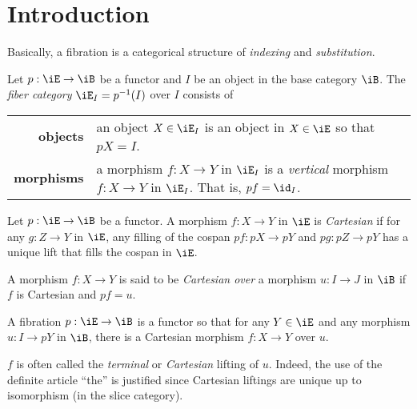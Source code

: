 \documentclass{amsart}
\title{}
\author{Frank Tsai}
\date{\today}
\begin{document}
\maketitle
\tableofcontents

\section{Introduction}
\label{sec:introduction}
Basically, a fibration is a categorical structure of \emph{indexing} and \emph{substitution}.

\begin{defn}
  Let $p : \iE \to \iB$ be a functor and $I$ be an object in the base category $\iB$.
  The \emph{fiber category} $\iE_{I} = p\inv(I)$ over $I$ consists of
  \begin{center}
    \begin{tabularx}{\linewidth}{rX}
      \textbf{objects} & an object $X \in \iE_{I}$ is an object in $X \in \iE$ so that $pX = I$.\\
      \textbf{morphisms} & a morphism $f : X \to Y$ in $\iE_{I}$ is a \emph{vertical} morphism $f : X \to Y$ in $\iE_{I}$.
                           That is, $pf = \id_{I}$.
    \end{tabularx}
  \end{center}
\end{defn}

\begin{defn}
  Let $p : \iE \to \iB$ be a functor.
  A morphism $f : X \to Y$ in $\iE$ is \emph{Cartesian} if for any $g : Z \to Y$ in $\iE$, any filling of the cospan $pf : pX \to pY$ and $pg : pZ \to pY$ has a unique lift that fills the cospan in $\iE$.
  
  
  A morphism $f : X \to Y$ is said to be \emph{Cartesian over} a morphism $u : I \to J$ in $\iB$ if $f$ is Cartesian and $pf = u$.
\end{defn}

\begin{defn}
  A fibration $p : \iE \to \iB$ is a functor so that for any $Y \in \iE$ and any morphism $u : I \to pY$ in $\iB$, there is a Cartesian morphism $f : X \to Y$ over $u$.
  

  $f$ is often called the \emph{terminal} or \emph{Cartesian} lifting of $u$.
  Indeed, the use of the definite article ``the'' is justified since Cartesian liftings are unique up to isomorphism (in the slice category).
\end{defn}
\end{document}

